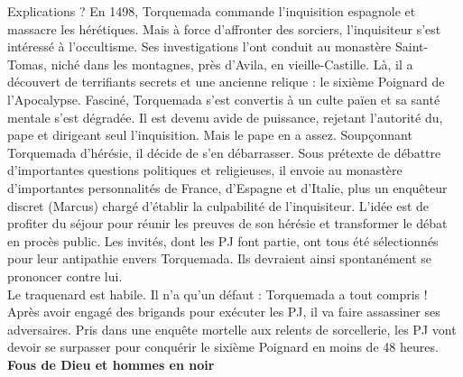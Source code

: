\documentclass[11pt,twoside,a4paper]{book}
\begin{document}
Explications ? En 1498, Torquemada commande l'inquisition espagnole et massacre les h{\'e}r{\'e}tiques. Mais {\`a} force d'affronter des sorciers, l'inquisiteur s'est int{\'e}ress{\'e} {\`a} l'occultisme. Ses investigations l'ont conduit au monast{\`e}re Saint-Tomas, nich{\'e} dans les montagnes, pr{\`e}s d'Avila, en vieille-Castille. L{\`a}, il a d{\'e}couvert de terrifiants secrets et une ancienne relique : le sixi{\`e}me Poignard de l'Apocalypse. Fascin{\'e}, Torquemada s'est convertis {\`a} un culte pa{\"i}en et sa sant{\'e} mentale s'est d{\'e}grad{\'e}e. Il est devenu avide de puissance, rejetant l'autorit{\'e} du, pape et dirigeant seul l'inquisition. Mais le pape en a assez. Soup\c{c}onnant Torquemada d'h{\'e}r{\'e}sie, il d{\'e}cide de s'en d{\'e}barrasser. Sous pr{\'e}texte de d{\'e}battre d'importantes questions politiques et religieuses, il envoie au monast{\`e}re d'importantes personnalit{\'e}s de France, d'Espagne et d'Italie, plus un enqu{\^e}teur discret (Marcus) charg{\'e} d'{\'e}tablir la culpabilit{\'e} de l'inquisiteur. L'id{\'e}e est de profiter du s{\'e}jour pour r{\'e}unir les preuves de son h{\'e}r{\'e}sie et transformer le d{\'e}bat en proc{\`e}s public. Les invit{\'e}s, dont les PJ font partie, ont tous {\'e}t{\'e} s{\'e}lectionn{\'e}s pour leur antipathie envers Torquemada. Ils devraient ainsi spontan{\'e}ment se prononcer contre lui.~\\

Le traquenard est habile. Il n'a qu'un d{\'e}faut : Torquemada a tout compris ! Apr{\`e}s avoir engag{\'e} des brigands pour ex{\'e}cuter les PJ, il va faire assassiner ses adversaires. Pris dans une enqu{\^e}te mortelle aux relents de sorcellerie, les PJ vont devoir se surpasser pour conqu{\'e}rir le sixi{\`e}me Poignard en moins de 48 heures.~\\

\textbf{\large Fous de Dieu et hommes en noir}~\\
\end{document}
